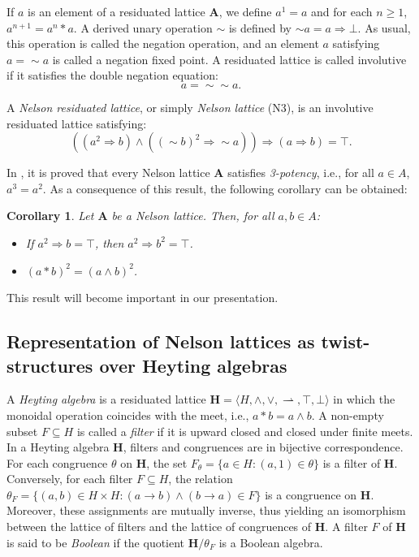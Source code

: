 \documentclass[pdflatex,sn-mathphys-num]{sn-jnl}%
\newtheorem{corollary}{Corollary}
\newcommand{\A}{\mathbf{A}}
\newcommand{\He}{\mathbf{H}}
\newcommand{\To}{\Rightarrow}
\theoremstyle{thmstyleone}%
\theoremstyle{thmstyletwo}%
\theoremstyle{thmstylethree}%
\begin{document}
If $a$ is an element of a residuated lattice $\A$, we define $a^1 = a$ and for each $n \geq 1$, $a^{n+1} = a^n * a$. A derived unary operation $\sim$ is defined by $\sim a = a \To \bot$. As usual, this operation is called the negation operation, and an element $a$ satisfying $a = \sim a$ is called a negation fixed point. A residuated lattice is called involutive if it satisfies the double negation equation:
$$ a = \sim \sim a. $$

A \emph{Nelson residuated lattice}, or simply \emph{Nelson lattice} (N3), is an involutive residuated lattice satisfying:
\[
((a^2 \To b) \wedge ((\sim b)^2 \To \sim a)) \To (a \To b) = \top.
\]


In \cite[Theorem 2.2]{Busaniche}, it is proved that every Nelson lattice $\mathbf{A}$ satisfies \emph{3-potency}, i.e., for all $a \in A$,  $a^3 = a^2$. As a consequence of this result, the following corollary can be obtained: 
\begin{corollary} \label{aux1}
Let $\mathbf{A}$ be a Nelson lattice. Then, for all $a, b \in A$:  
 \begin{itemize}
     \item[(a)] If $a^2 \To b = \top$, then $a^2 \To b^2 = \top$.
     \item[(b)] $(a * b)^2 = (a \wedge b)^2$.  
 \end{itemize}
 \end{corollary}
This result will become important in our presentation.

\subsection{Representation of Nelson lattices as twist-structures over Heyting algebras}

A \emph{Heyting algebra} is a  residuated lattice
$\He =\langle H,\wedge,\vee,\rightharpoonup,\top,\bot\rangle$  in which the monoidal operation coincides with the meet, i.e., $a * b = a \wedge b$. A non-empty subset $F \subseteq H$ is called a \emph{filter} if it is upward closed and closed under finite meets. In a Heyting algebra $\He$, filters and congruences are in bijective correspondence. For each congruence $\theta$ on $\He$, the set $F_\theta = \{a \in H : (a,1) \in \theta\}$ is a filter of $\He$. Conversely, for each filter $F \subseteq H$, the relation $\theta_F = \{(a,b) \in H \times H : (a \to b) \wedge (b \to a) \in F\}$ is a congruence on $\He$. Moreover, these assignments are mutually inverse, thus yielding an isomorphism between the lattice of filters and the lattice of congruences of $\He$. A filter $F$ of $\He$ is said to be \emph{Boolean} if the quotient $\He/\theta_F$ is a Boolean algebra.
\end{document}
